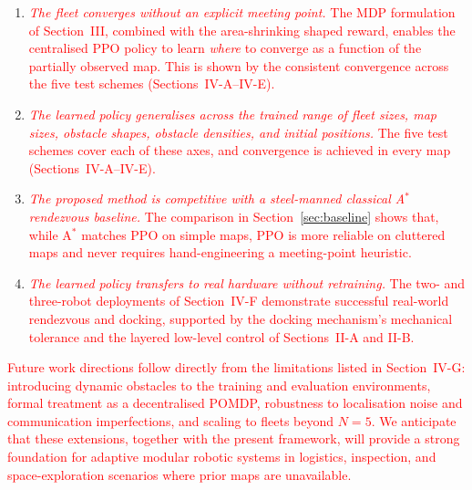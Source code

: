 \documentclass[journal]{IEEEtran}
\begin{document}
\begin{enumerate}
\item \textcolor{red}{\emph{The fleet converges without an explicit meeting point.} The MDP formulation of Section~III, combined with the area-shrinking shaped reward, enables the centralised PPO policy to learn \emph{where} to converge as a function of the partially observed map. This is shown by the consistent convergence across the five test schemes (Sections~IV-A--IV-E).}
\item \textcolor{red}{\emph{The learned policy generalises across the trained range of fleet sizes, map sizes, obstacle shapes, obstacle densities, and initial positions.} The five test schemes cover each of these axes, and convergence is achieved in every map (Sections~IV-A--IV-E).}
\item \textcolor{red}{\emph{The proposed method is competitive with a steel-manned classical A$^{*}$ rendezvous baseline.} The comparison in Section~\ref{sec:baseline} shows that, while A$^{*}$ matches PPO on simple maps, PPO is more reliable on cluttered maps and never requires hand-engineering a meeting-point heuristic.}
\item \textcolor{red}{\emph{The learned policy transfers to real hardware without retraining.} The two- and three-robot deployments of Section~IV-F demonstrate successful real-world rendezvous and docking, supported by the docking mechanism's mechanical tolerance and the layered low-level control of Sections~II-A and II-B.}
\end{enumerate}

\textcolor{red}{Future work directions follow directly from the limitations listed in Section~IV-G: introducing dynamic obstacles to the training and evaluation environments, formal treatment as a decentralised POMDP, robustness to localisation noise and communication imperfections, and scaling to fleets beyond $N = 5$. We anticipate that these extensions, together with the present framework, will provide a strong foundation for adaptive modular robotic systems in logistics, inspection, and space-exploration scenarios where prior maps are unavailable.}



\end{document}
